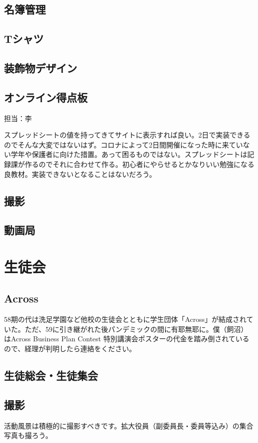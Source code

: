 \documentclass[dvipdfmx,jb5]{jarticle}
\begin{document}
\subsection{名簿管理}
\subsection{Tシャツ}
\subsection{装飾物デザイン}
\subsection{オンライン得点板}
担当：李

スプレッドシートの値を持ってきてサイトに表示すれば良い。2日で実装できるのでそんな大変ではないはず。コロナによって2日間開催になった時に来ていない学年や保護者に向けた措置。あって困るものではない。スプレッドシートは記録課が作るのでそれに合わせて作る。初心者にやらせるとかなりいい勉強になる良教材。実装できないとなることはないだろう。
\subsection{撮影}
\subsection{動画局}


\section{生徒会}
\subsection{Across}
58期の代は洗足学園など他校の生徒会とともに学生団体「Across」が結成されていた。ただ、59に引き継がれた後パンデミックの間に有耶無耶に。僕（飼沼）はAcross Business Plan Contest 特別講演会ポスターの代金を踏み倒されているので、経理が判明したら連絡をください。

\subsection{生徒総会・生徒集会}
\subsection{撮影}
活動風景は積極的に撮影すべきです。拡大役員（副委員長・委員等込み）の集合写真も撮ろう。
\end{document}
